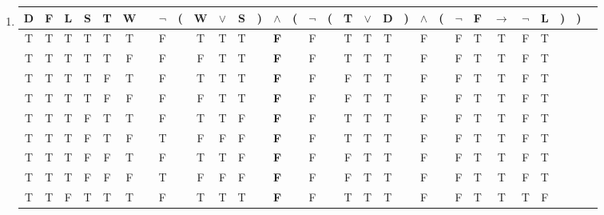\begin{enumerate}
	\item
	      \begin{tabular}{@{ }c@{ }@{ }c@{ }@{ }c@{ }@{ }c@{ }@{ }c@{ }@{ }c | c@{ }@{ }c@{ }@{}c@{}@{ }c@{ }@{ }c@{ }@{ }c@{ }@{}c@{}@{ }c@{ }@{}c@{}@{ }c@{ }@{}c@{}@{ }c@{ }@{ }c@{ }@{ }c@{ }@{}c@{}@{ }c@{ }@{}c@{}@{ }c@{ }@{ }c@{ }@{ }c@{ }@{ }c@{ }@{ }c@{ }@{}c@{}@{}c@{}@{ }c}
		      D & F & L & S & T & W &  & $\lnot$ & ( & W & $\lor$ & S & ) & $\land$    & ( & $\lnot$ & ( & T & $\lor$ & D & ) & $\land$ & ( & $\lnot$ & F & $\rightarrow$ & $\lnot$ & L & ) & ) & \\
		      \hline
		      T & T & T & T & T & T &  & F       &   & T & T      & T &   & \textbf{F} &   & F       &   & T & T      & T &   & F       &   & F       & T & T             & F       & T &   &   & \\
		      T & T & T & T & T & F &  & F       &   & F & T      & T &   & \textbf{F} &   & F       &   & T & T      & T &   & F       &   & F       & T & T             & F       & T &   &   & \\
		      T & T & T & T & F & T &  & F       &   & T & T      & T &   & \textbf{F} &   & F       &   & F & T      & T &   & F       &   & F       & T & T             & F       & T &   &   & \\
		      T & T & T & T & F & F &  & F       &   & F & T      & T &   & \textbf{F} &   & F       &   & F & T      & T &   & F       &   & F       & T & T             & F       & T &   &   & \\
		      T & T & T & F & T & T &  & F       &   & T & T      & F &   & \textbf{F} &   & F       &   & T & T      & T &   & F       &   & F       & T & T             & F       & T &   &   & \\
		      T & T & T & F & T & F &  & T       &   & F & F      & F &   & \textbf{F} &   & F       &   & T & T      & T &   & F       &   & F       & T & T             & F       & T &   &   & \\
		      T & T & T & F & F & T &  & F       &   & T & T      & F &   & \textbf{F} &   & F       &   & F & T      & T &   & F       &   & F       & T & T             & F       & T &   &   & \\
		      T & T & T & F & F & F &  & T       &   & F & F      & F &   & \textbf{F} &   & F       &   & F & T      & T &   & F       &   & F       & T & T             & F       & T &   &   & \\
		      T & T & F & T & T & T &  & F       &   & T & T      & T &   & \textbf{F} &   & F       &   & T & T      & T &   & F       &   & F       & T & T             & T       & F &   &   & \\

\end{tabular}
\end{enumerate}
